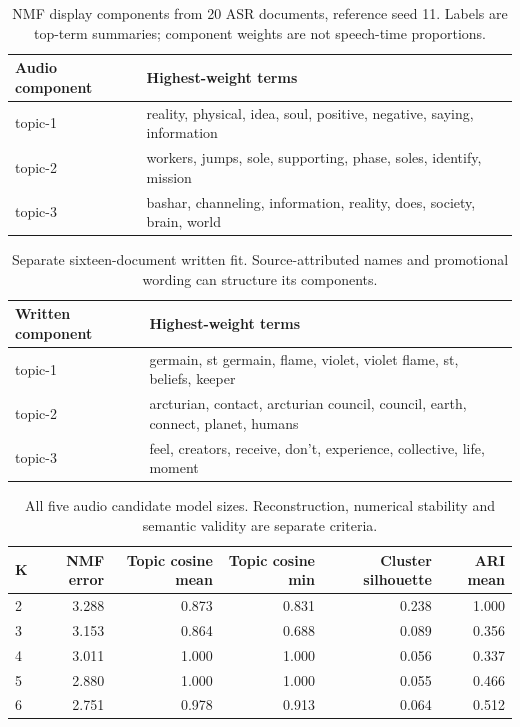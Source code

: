 \begin{table}[t]
\centering\small
\begin{tabular}{lp{}}
\toprule
Audio component & Highest-weight terms\\
\midrule
topic-1 & reality, physical, idea, soul, positive, negative, saying, information\\
topic-2 & workers, jumps, sole, supporting, phase, soles, identify, mission\\
topic-3 & bashar, channeling, information, reality, does, society, brain, world\\
\bottomrule
\end{tabular}
\caption{NMF display components from 20 ASR documents, reference seed 11. Labels are top-term summaries; component weights are not speech-time proportions.}
\label{tab:topics}
\end{table}
\begin{table}[t]
\centering\small
\begin{tabular}{lp{}}
\toprule
Written component & Highest-weight terms\\
\midrule
topic-1 & germain, st germain, flame, violet, violet flame, st, beliefs, keeper\\
topic-2 & arcturian, contact, arcturian council, council, earth, connect, planet, humans\\
topic-3 & feel, creators, receive, don't, experience, collective, life, moment\\
\bottomrule
\end{tabular}
\caption{Separate sixteen-document written fit. Source-attributed names and promotional wording can structure its components.}
\end{table}
\begin{table}[t]
\centering\small
\begin{tabular}{lrrrrr}
\toprule
K & NMF error & Topic cosine mean & Topic cosine min & Cluster silhouette & ARI mean\\
\midrule
2 & 3.288 & 0.873 & 0.831 & 0.238 & 1.000\\
3 & 3.153 & 0.864 & 0.688 & 0.089 & 0.356\\
4 & 3.011 & 1.000 & 1.000 & 0.056 & 0.337\\
5 & 2.880 & 1.000 & 1.000 & 0.055 & 0.466\\
6 & 2.751 & 0.978 & 0.913 & 0.064 & 0.512\\
\bottomrule
\end{tabular}
\caption{All five audio candidate model sizes. Reconstruction, numerical stability and semantic validity are separate criteria.}
\end{table}
